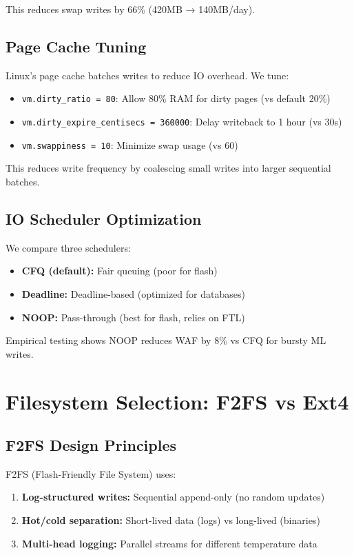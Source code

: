 \documentclass[conference]{IEEEtran}
\begin{document}
This reduces swap writes by 66\% (420MB → 140MB/day).

\subsection{Page Cache Tuning}

Linux's page cache batches writes to reduce IO overhead. We tune:

\begin{itemize}
    \item \texttt{vm.dirty\_ratio = 80}: Allow 80\% RAM for dirty pages (vs default 20\%)
    \item \texttt{vm.dirty\_expire\_centisecs = 360000}: Delay writeback to 1 hour (vs 30s)
    \item \texttt{vm.swappiness = 10}: Minimize swap usage (vs 60)
\end{itemize}

This reduces write frequency by coalescing small writes into larger sequential batches.

\subsection{IO Scheduler Optimization}

We compare three schedulers:
\begin{itemize}
    \item \textbf{CFQ (default):} Fair queuing (poor for flash)
    \item \textbf{Deadline:} Deadline-based (optimized for databases)
    \item \textbf{NOOP:} Pass-through (best for flash, relies on FTL)
\end{itemize}

Empirical testing shows NOOP reduces WAF by 8\% vs CFQ for bursty ML writes.

\section{Filesystem Selection: F2FS vs Ext4}

\subsection{F2FS Design Principles}

F2FS (Flash-Friendly File System) \cite{b1} uses:
\begin{enumerate}
    \item \textbf{Log-structured writes:} Sequential append-only (no random updates)
    \item \textbf{Hot/cold separation:} Short-lived data (logs) vs long-lived (binaries)
    \item \textbf{Multi-head logging:} Parallel streams for different temperature data
\end{enumerate}
\end{document}
